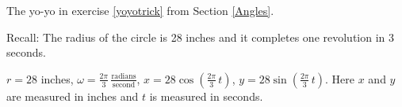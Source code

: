 {The yo-yo in exercise \ref{yoyotrick} from Section \ref{Angles}.

Recall: The radius of the circle is 28 inches and it completes one revolution in 3 seconds.}
{$r = 28$ inches, $\omega = \frac{2\pi}{3} \, \frac{\text{radians}}{\text{second}}$,  $x = 28 \cos\left(\frac{2\pi}{3} \, t \right)$, $y = 28 \sin\left(\frac{2\pi}{3} \, t \right)$.  Here $x$ and $y$ are measured in inches and $t$ is measured in seconds.}